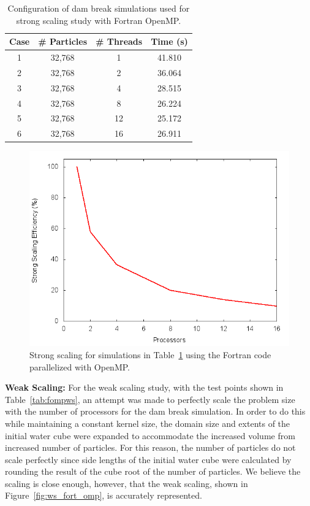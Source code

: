 \documentclass{scrartcl}
\begin{document}
      \begin{table}
      	\begin{center}
      		\begin{tabular}{| c | c | c | c |}
      			\hline
      			Case & \# Particles & \# Threads & Time (s) \\ \hline		  		
      			1 & 32,768 &  1 & 41.810 \\ \hline		  		
      			2 & 32,768 &  2 & 36.064 \\ \hline		  		
      			3 & 32,768 &  4 & 28.515 \\ \hline		  		
      			4 & 32,768 &  8 & 26.224 \\ \hline		  		
      			5 & 32,768 & 12 & 25.172 \\ \hline		  		
      			6 & 32,768 & 16 & 26.911 \\ \hline		  		
      		\end{tabular}
      		\caption{Configuration of dam break simulations used for strong scaling study with Fortran OpenMP.}
      		\label{tab:fompss}
      	\end{center}
      \end{table}
  \begin{figure}
  	\begin{center}
	  	\includegraphics[width=0.7\columnwidth]{./fort_scaling/ss.png}
	  	\caption{Strong scaling for simulations in Table~\ref{tab:fompss} using the Fortran code parallelized with OpenMP.}
		\label{fig:ss_fort_omp}
  	\end{center}
  \end{figure}
  
  
  \textbf{Weak Scaling:}  
  For the weak scaling study, with the test points shown in Table~\ref{tab:fompws}, an attempt was made to perfectly scale the problem size with the number of processors for the dam break simulation. In order to do this while maintaining a constant kernel size, the domain size and extents of the initial water cube were expanded to accommodate the increased volume from increased number of particles. For this reason, the number of particles do not scale perfectly since side lengths of the initial water cube were calculated by rounding the result of the cube root of the number of particles. We believe the scaling is close enough, however, that the weak scaling, shown in Figure~\ref{fig:ws_fort_omp}, is accurately represented.
  
\end{document}
